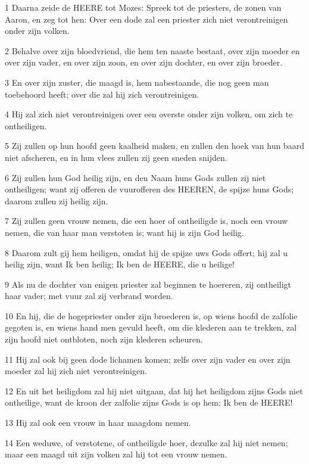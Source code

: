 \par 1 Daarna zeide de HEERE tot Mozes: Spreek tot de priesters, de zonen van Aaron, en zeg tot hen: Over een dode zal een priester zich niet verontreinigen onder zijn volken.
\par 2 Behalve over zijn bloedvriend, die hem ten naaste bestaat, over zijn moeder en over zijn vader, en over zijn zoon, en over zijn dochter, en over zijn broeder.
\par 3 En over zijn zuster, die maagd is, hem nabestaande, die nog geen man toebehoord heeft; over die zal hij zich verontreinigen.
\par 4 Hij zal zich niet verontreinigen over een overste onder zijn volken, om zich te ontheiligen.
\par 5 Zij zullen op hun hoofd geen kaalheid maken, en zullen den hoek van hun baard niet afscheren, en in hun vlees zullen zij geen sneden snijden.
\par 6 Zij zullen hun God heilig zijn, en den Naam huns Gods zullen zij niet ontheiligen; want zij offeren de vuurofferen des HEEREN, de spijze huns Gods; daarom zullen zij heilig zijn.
\par 7 Zij zullen geen vrouw nemen, die een hoer of ontheiligde is, noch een vrouw nemen, die van haar man verstoten is; want hij is zijn God heilig.
\par 8 Daarom zult gij hem heiligen, omdat hij de spijze uws Gods offert; hij zal u heilig zijn, want Ik ben heilig; Ik ben de HEERE, die u heilige!
\par 9 Als nu de dochter van enigen priester zal beginnen te hoereren, zij ontheiligt haar vader; met vuur zal zij verbrand worden.
\par 10 En hij, die de hogepriester onder zijn broederen is, op wiens hoofd de zalfolie gegoten is, en wiens hand men gevuld heeft, om die klederen aan te trekken, zal zijn hoofd niet ontbloten, noch zijn klederen scheuren.
\par 11 Hij zal ook bij geen dode lichamen komen; zelfs over zijn vader en over zijn moeder zal hij zich niet verontreinigen.
\par 12 En uit het heiligdom zal hij niet uitgaan, dat hij het heiligdom zijns Gods niet ontheilige, want de kroon der zalfolie zijns Gods is op hem; Ik ben de HEERE!
\par 13 Hij zal ook een vrouw in haar maagdom nemen.
\par 14 Een weduwe, of verstotene, of ontheiligde hoer, dezulke zal hij niet nemen; maar een maagd uit zijn volken zal hij tot een vrouw nemen.
